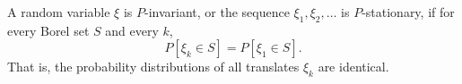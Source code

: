 A random variable $\xi$ is $P$-invariant, or the sequence $\xi_1, \xi_2, \ldots$ is $P$-stationary, if for every Borel set $S$ and every $k$,
$$P[\xi_k \in S] = P[\xi_1 \in S].$$
That is, the probability distributions of all translates $\xi_k$ are identical.
